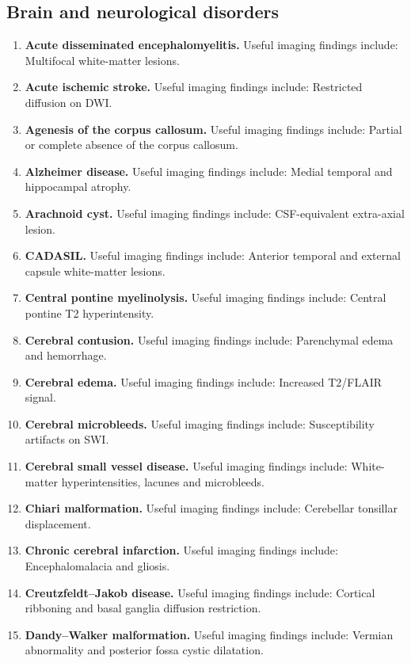\subsection{Brain and neurological disorders}
\begin{enumerate}[leftmargin=*,itemsep=0.45em,topsep=0.4em]
\item \textbf{Acute disseminated encephalomyelitis.} Useful imaging findings include: Multifocal white-matter lesions.
\item \textbf{Acute ischemic stroke.} Useful imaging findings include: Restricted diffusion on DWI.
\item \textbf{Agenesis of the corpus callosum.} Useful imaging findings include: Partial or complete absence of the corpus callosum.
\item \textbf{Alzheimer disease.} Useful imaging findings include: Medial temporal and hippocampal atrophy.
\item \textbf{Arachnoid cyst.} Useful imaging findings include: CSF-equivalent extra-axial lesion.
\item \textbf{CADASIL.} Useful imaging findings include: Anterior temporal and external capsule white-matter lesions.
\item \textbf{Central pontine myelinolysis.} Useful imaging findings include: Central pontine T2 hyperintensity.
\item \textbf{Cerebral contusion.} Useful imaging findings include: Parenchymal edema and hemorrhage.
\item \textbf{Cerebral edema.} Useful imaging findings include: Increased T2/FLAIR signal.
\item \textbf{Cerebral microbleeds.} Useful imaging findings include: Susceptibility artifacts on SWI.
\item \textbf{Cerebral small vessel disease.} Useful imaging findings include: White-matter hyperintensities, lacunes and microbleeds.
\item \textbf{Chiari malformation.} Useful imaging findings include: Cerebellar tonsillar displacement.
\item \textbf{Chronic cerebral infarction.} Useful imaging findings include: Encephalomalacia and gliosis.
\item \textbf{Creutzfeldt--Jakob disease.} Useful imaging findings include: Cortical ribboning and basal ganglia diffusion restriction.
\item \textbf{Dandy--Walker malformation.} Useful imaging findings include: Vermian abnormality and posterior fossa cystic dilatation.

\end{enumerate}
